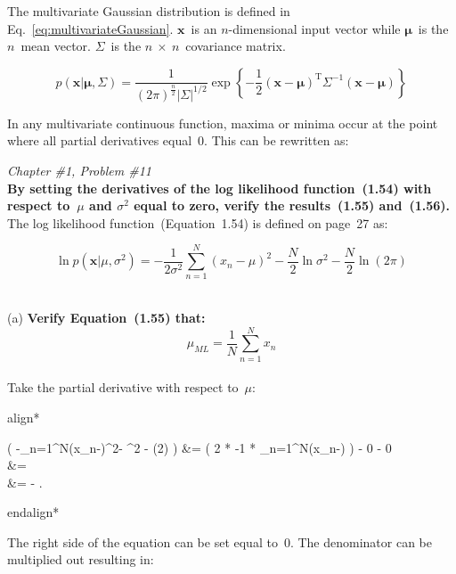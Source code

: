 \documentclass{report}
\newcommand{\hangindentdistance}{1cm}
\newenvironment{aligncustom}
{ \csname align*\endcsname %
    \centering
}
{
  \csname endalign*\endcsname
}
\newcommand{\subproblem}[2]{~\\ (#1) \hangindent=\hangindentdistance \hangafter=2 \tabto{\hangindentdistance} \textbf{#2}~\\}
\newcommand{\problem}[3]{\noindent \textit{Chapter \##1, Problem \##2}
  \\
  \textbf{#3}  \\}
\begin{document}
  The multivariate Gaussian distribution is defined in Eq.~\eqref{eq:multivariateGaussian}.  $\mathbf{x}$~is an $n$-dimensional input vector while $\bm{\mu}$~is the $n$~mean vector.  $\Sigma$~is the $n~\times~n$~covariance matrix.
    
  \begin{equation}
    p(\mathbf{x} | \bm{\mu}, \Sigma) = \frac{1}{(2\pi)^{\frac{n}{2}} | \Sigma | ^ {1/2} } \exp\left\{-\frac{1}{2} \left(\mathbf{x}-\bm{\mu} \right)^{\textrm{T}}\Sigma^{-1}\left(\mathbf{x}-\bm{\mu}\right) \right\}
    \label{eq:multivariateGaussian}
  \end{equation}


  In any multivariate continuous function, maxima or minima occur at the point where all partial derivatives equal~$0$.  This can be rewritten as:
  
  

  \newpage
  \problem{1}{11}{By setting the derivatives of the log likelihood function~(1.54) with respect to~$\mu$ and $\sigma^2$ equal to zero, verify the results~(1.55) and~(1.56).}
  
  The log likelihood function~(Equation~1.54) is defined on page~27 as:
  
  \begin{equation}
    \ln p(\textbf{x}|\mu,\sigma^2)=-\frac{1}{2\sigma^2}\sum_{n=1}^{N}(x_{n}-\mu)^2-\frac{N}{2} \ln \sigma^2 -\frac{N}{2} \ln (2\pi)
  \end{equation}
  
  \subproblem{a}{Verify Equation~(1.55) that:
      \[ \mu_{ML} = \frac{1}{N}\sum_{n=1}^{N}x_{n} \]
  }

  Take the partial derivative with respect to~$\mu$:
  
  \begin{aligncustom}
    \frac{\partial}{\partial \mu} \left( -\sum_{n=1}^{N}(x_{n}-\mu)^2- \ln \sigma^2 - \ln (2\pi) \right) &= \left( 2 * -1 * \sum_{n=1}^{N}(x_{n}-\mu) \right)  - 0 - 0 \\
    &=  \\
    &=  - \textrm{.}
  \end{aligncustom}

  The right side of the equation can be set equal to~$0$.  The denominator can be multiplied out resulting in:
  
\end{document}
